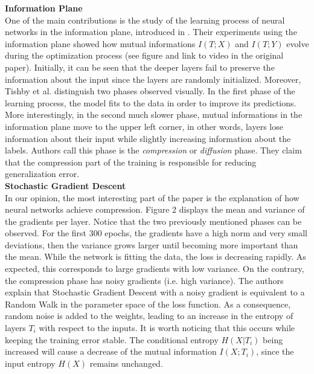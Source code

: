 \documentclass[twocolumn,superscriptaddress,aps]{revtex4-1}
\begin{document}
\noindent \textbf{Information Plane} \\[0.15cm]
\indent One of the main contributions is the study of the learning process of neural networks in the information plane, introduced in \citep{Tishby2}. Their experiments using the information plane showed how mutual informations $I(T;X)$ and $I(T;Y)$ evolve during the optimization process (see figure and link to video in the original paper). Initially, it can be seen that the deeper layers fail to preserve the information about the input since the layers are randomly initialized. Moreover, Tishby et al. distinguish two phases observed visually. In the first phase of the learning process, the model fits to the data in order to improve its predictions. More interestingly, in the second much slower phase, mutual informations in the information plane move to the upper left corner, in other words, layers lose information about their input while slightly increasing information about the labels. Authors call this phase is the \textit{compression} or \textit{diffusion} phase. They claim that the compression part of the training is responsible for reducing generalization error.\\

\noindent \textbf{Stochastic Gradient Descent} \\[0.15cm]
\indent In our opinion, the most interesting part of the paper is the explanation of how neural networks achieve compression. Figure 2 displays the mean and variance of the gradients per layer. Notice that the two previously mentioned phases can be observed. For the first 300 epochs, the gradients have a high norm and very small deviations, then the variance grows larger until becoming more important than the mean. While the network is fitting the data, the loss is decreasing rapidly. As expected, this corresponds to large gradients with low variance. On the contrary, the compression phase has noisy gradients (i.e. high variance). The authors explain that Stochastic Gradient Descent with a noisy gradient is equivalent to a Random Walk in the parameter space of the loss function. As a consequence, random noise is added to the weights, leading to an increase in the entropy of layers $T_i$ with respect to the inputs. It is worth noticing that this occurs while keeping the training error stable.  The conditional entropy $H(X|T_i)$ being increased will cause a decrease of the mutual information $I(X;T_i)$, since the input entropy $H(X)$ remains unchanged.\\
\end{document}
